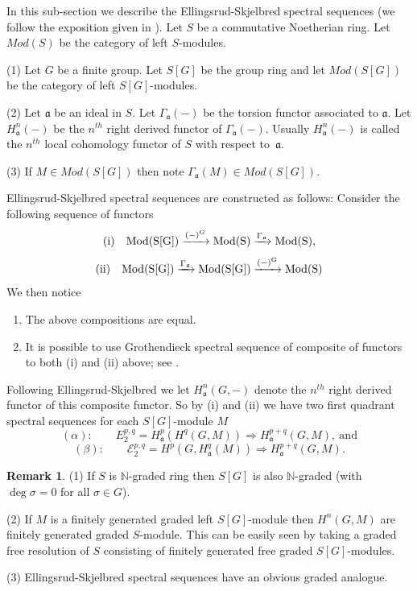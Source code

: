 \documentclass{amsart}
\newcommand{\wrt}{with respect to}
\newcommand{\A}{\mathfrak{a} }
\theoremstyle{plain}
\theoremstyle{definition}
\newtheorem{remark}[theorem]{Remark}
\theoremstyle{remark}
\begin{document}
In this sub-section we describe the Ellingsrud-Skjelbred spectral sequences \cite{ES} (we follow the exposition given in \cite[8.6]{Lorenz}).
\s Let $S$ be a commutative Noetherian ring. Let $Mod(S)$ be the category of left $S$-modules.

(1) Let $G$ be a finite group. Let $S[G]$ be the group ring and let $Mod(S[G])$ be the category of left $S[G]$-modules.


(2) Let $\A$ be an ideal in $S$. Let $\Gamma_\A(-)$ be the torsion functor associated to $\A$.  Let $H^n_\A(-)$ be the $n^{th}$ right derived functor of
$\Gamma_\A(-)$. Usually $H^n_\A(-)$ is called the $n^{th}$ local cohomology functor of $S$ \wrt \ $\A$.

(3) If $M \in Mod(S[G])$ then note $\Gamma_\A(M) \in Mod(S[G])$.

\s Ellingsrud-Skjelbred spectral sequences  are constructed as follows: Consider the following sequence of functors
\[
\rm{(i)} \quad   Mod(S[G]) \xrightarrow{(-)^G} Mod(S) \xrightarrow{\Gamma_\A} Mod(S),
\]
\[
\rm{(ii)}   \quad   Mod(S[G]) \xrightarrow{\Gamma_\A} Mod(S[G]) \xrightarrow{(-)^G} Mod(S)
\]
We then notice
\begin{enumerate}[\rm (a)]
\item
The above compositions are equal.
\item
It is possible to use Grothendieck spectral sequence of composite of functors to both (i) and (ii) above; see
\cite[8.6.2]{Lorenz}.
\end{enumerate}
Following Ellingsrud-Skjelbred  we let $H^n_\A(G,-)$ denote the $n^{th}$ right derived functor of this composite
functor. So by (i) and (ii) we have two first quadrant spectral sequences for each $S[G]$-module $M$
\[
(\alpha)\colon \quad \quad  E_2^{p,q} = H^p_\A(H^q(G, M)) \Longrightarrow H^{p+q}_\A(G,M), \ \text{and}
\]
\[
(\beta)\colon \quad \quad \mathcal{E}_2^{p,q} = H^p(G, H^q_\A(M)) \Longrightarrow H^{p+q}_\A(G,M).
\]
\begin{remark}\label{grading}
(1) If $S$ is $\mathbb{N}$-graded ring then $S[G]$ is also $\mathbb{N}$-graded (with $\deg \sigma = 0$ for all $\sigma \in G$).

(2)  If $M$ is a finitely generated graded left $S[G]$-module then $H^n(G, M)$ are finitely generated graded $S$-module. This can be easily seen by taking a graded free resolution of $S$ consisting of finitely generated free  graded $S[G]$-modules.

(3) Ellingsrud-Skjelbred spectral sequences have an obvious graded analogue.
\end{remark}
\end{document}
